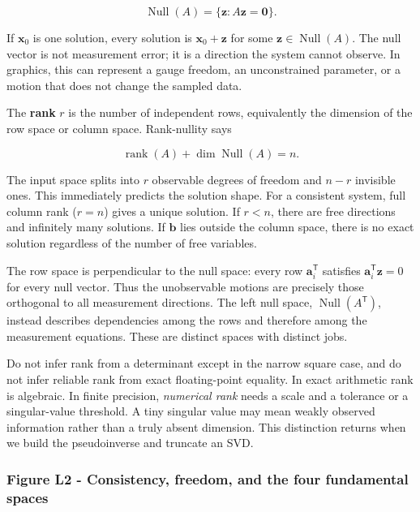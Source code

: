 \[
\operatorname{Null}(A)=\{\mathbf z:A\mathbf z=\mathbf0\}.
\]

If \(\mathbf x_0\) is one solution, every solution is \(\mathbf x_0+\mathbf z\) for some \(\mathbf z\in\operatorname{Null}(A)\). The null vector is not measurement error; it is a direction the system cannot observe. In graphics, this can represent a gauge freedom, an unconstrained parameter, or a motion that does not change the sampled data.

The \textbf{rank} \(r\) is the number of independent rows, equivalently the dimension of the row space or column space. Rank-nullity says

\[
\operatorname{rank}(A)+\dim\operatorname{Null}(A)=n.
\]

The input space splits into \(r\) observable degrees of freedom and \(n-r\) invisible ones. This immediately predicts the solution shape. For a consistent system, full column rank (\(r=n\)) gives a unique solution. If \(r<n\), there are free directions and infinitely many solutions. If \(\mathbf b\) lies outside the column space, there is no exact solution regardless of the number of free variables.

The row space is perpendicular to the null space: every row \(\mathbf a_i^\mathsf T\) satisfies \(\mathbf a_i^\mathsf T\mathbf z=0\) for every null vector. Thus the unobservable motions are precisely those orthogonal to all measurement directions. The left null space, \(\operatorname{Null}(A^\mathsf T)\), instead describes dependencies among the rows and therefore among the measurement equations. These are distinct spaces with distinct jobs.

Do not infer rank from a determinant except in the narrow square case, and do not infer reliable rank from exact floating-point equality. In exact arithmetic rank is algebraic. In finite precision, \emph{numerical rank} needs a scale and a tolerance or a singular-value threshold. A tiny singular value may mean weakly observed information rather than a truly absent dimension. This distinction returns when we build the pseudoinverse and truncate an SVD.

\subsubsection{Figure L2 - Consistency, freedom, and the four fundamental spaces}\label{01-foundations-i-ch019-figure-l2---consistency-freedom-and-the-four-fundamental-spaces}

\hypertarget{01-foundations-i-ch019-figure-l2---consistency-freedom-and-the-four-fundamental-spaces}{}

